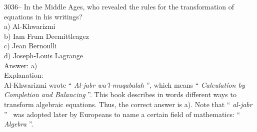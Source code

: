 \documentclass[letterpaper, 12pt]{article}
\begin{document}




3036-- In the Middle Ages, who revealed the rules for the transformation of equations in his writings?\\

a) Al-Khwarizmi\\
b) Iam Frum Deemittleagez\\
c) Jean Bernoulli\\
d) Joseph-Louis Lagrange\\

Answer: a)\\

Explanation:\\
Al-Khwarizmi wrote `` \emph{Al-jabr wa'l-muqabalah} '', which means `` \emph{Calculation by Completion and Balancing} ''. This book describes in words different ways to transform algebraic equations. Thus, the correct answer is a). Note that `` \emph{al-jabr} '' \ was adopted later by Europeans to name a certain field of mathematics: `` \emph{Algebra} ''.
\end{document}
